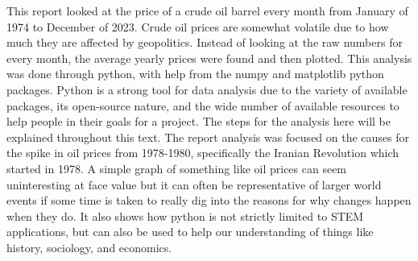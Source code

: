 This report looked at the price of a crude oil barrel every month from January of 1974 to December of 2023. Crude oil prices are somewhat volatile due to how much they are affected by geopolitics. Instead of looking at the raw numbers for every month, the average yearly prices were found and then plotted. This analysis was done through python, with help from the numpy and matplotlib python packages. Python is a strong tool for data analysis due to the variety of available packages, its open-source nature, and the wide number of available resources to help people in their goals for a project. The steps for the analysis here will be explained throughout this text. The report analysis was focused on the causes for the spike in oil prices from 1978-1980, specifically the Iranian Revolution which started in 1978. A simple graph of something like oil prices can seem uninteresting at face value but it can often be representative of larger world events if some time is taken to really dig into the reasons for why changes happen when they do. It also shows how python is not strictly limited to STEM applications, but can also be used to help our understanding of things like history, sociology, and economics.
